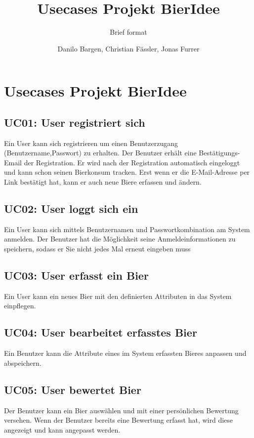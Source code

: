 \documentclass[10pt,a4paper]{scrartcl}
\author{Danilo Bargen, Christian Fässler, Jonas Furrer}
\title{Usecases Projekt BierIdee}
\subtitle{Brief format}
\begin{document}
\begin{titlepage}
	\maketitle
	\vspace{120mm}
	\thispagestyle{empty} %
\end{titlepage}



\section{Usecases Projekt BierIdee}

\subsection*{UC01: User registriert sich}
Ein User kann sich registrieren um einen Benutzerzugang (Benutzername,Passwort) zu erhalten. Der Benutzer erhält eine Bestätigungs-Email der Registration. Er wird nach der Registration automatisch eingeloggt und kann schon seinen Bierkonsum tracken. Erst wenn er die E-Mail-Adresse per Link bestätigt hat, kann er auch neue Biere erfassen und ändern.
\subsection*{UC02: User loggt sich ein}
Ein User kann sich mittels Benutzernamen und Passwortkombination am System anmelden.
Der Benutzer hat die Möglichkeit seine Anmeldeinformationen zu speichern, sodass er Sie nicht jedes Mal erneut eingeben muss
\subsection*{UC03: User erfasst ein Bier}
Ein User kann ein neues Bier mit den definierten Attributen in das System einpflegen.
\subsection*{UC04: User bearbeitet erfasstes Bier}
Ein Benutzer kann die Attribute eines im System erfassten Bieres anpassen und abspeichern.
\subsection*{UC05: User bewertet Bier}
Der Benutzer kann ein Bier auswählen und mit einer persönlichen Bewertung versehen. Wenn der Benutzer bereits eine Bewertung erfasst hat, wird diese angezeigt und kann angepasst werden.
\end{document}
